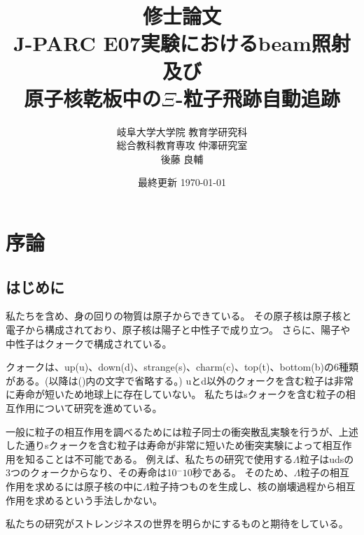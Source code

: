\documentclass[12pt,a4paper]{jarticle}
\begin{document}
\begin{titlepage}
\title{\vspace{60mm} \LARGE 修士論文\vspace{10mm}\\J-PARC E07実験におけるbeam照射及び\\原子核乾板中の$\Xi$-粒子飛跡自動追跡}
\author{\Large 岐阜大学大学院 教育学研究科 \\ \vspace{5mm}
\Large 総合教科教育専攻 仲澤研究室 \\ \vspace{5mm}
\LARGE 後藤 良輔}
\date{最終更新 \today}
\maketitle
\thispagestyle{empty} %
\end{titlepage}

\thispagestyle{empty} %
\tableofcontents
\newpage
\section{序論}
\subsection{はじめに}
私たちを含め、身の回りの物質は原子からできている。
その原子核は原子核と電子から構成されており、原子核は陽子と中性子で成り立つ。
さらに、陽子や中性子はクォークで構成されている。
\par
クォークは、up(u)、down(d)、strange(s)、charm(c)、top(t)、bottom(b)の6種類がある。(以降は()内の文字で省略する。)
uとd以外のクォークを含む粒子は非常に寿命が短いため地球上に存在していない。
私たちはsクォークを含む粒子の相互作用について研究を進めている。
\par
一般に粒子の相互作用を調べるためには粒子同士の衝突散乱実験を行うが、上述した通りsクォークを含む粒子は寿命が非常に短いため衝突実験によって相互作用を知ることは不可能である。
例えば、私たちの研究で使用する$\Lambda$粒子はudsの3つのクォークからなり、その寿命は10$^-10$秒である。
そのため、$\Lambda$粒子の相互作用を求めるには原子核の中に$\Lambda$粒子持つものを生成し、核の崩壊過程から相互作用を求めるという手法しかない。
\par
私たちの研究がストレンジネスの世界を明らかにするものと期待をしている。
\end{document}
